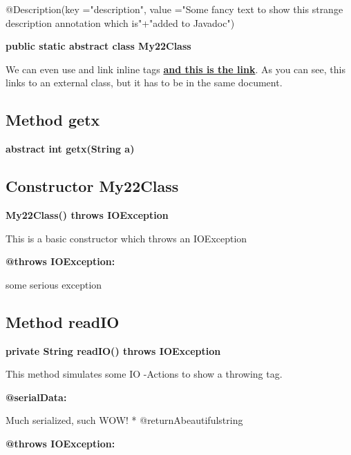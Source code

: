 \documentclass[12pt]{scrreprt}
\begin{document}
@Description(key ="description", value ="Some fancy text to show this strange description annotation which is"+"added to Javadoc")



\textbf{public static abstract class My22Class}


We can even use and link inline tags \hyperref[examples.AnotherClass]{\textbf{\color{inlineTagLink} and this is the link}}. As you can see, this links to an external class, but it has to be in the same document.



\subsection{Method getx}
\label{examples.SimpleExample.My22Class:getx}




\textbf{abstract int getx(String a)}








\subsection{Constructor My22Class}
\label{examples.SimpleExample.My22Class:My22Class}




\textbf{My22Class() throws IOException}


This is a basic constructor which throws an IOException




\textbf{@throws IOException:}

\quad\quad some serious exception


\subsection{Method readIO}
\label{examples.SimpleExample.My22Class:readIO}




\textbf{private String readIO() throws IOException}


This method simulates some IO -Actions to show a throwing tag.


\textbf{@serialData:}

\quad\quad Much serialized, such WOW! 
         * @returnAbeautifulstring



\textbf{@throws IOException:}
\end{document}

